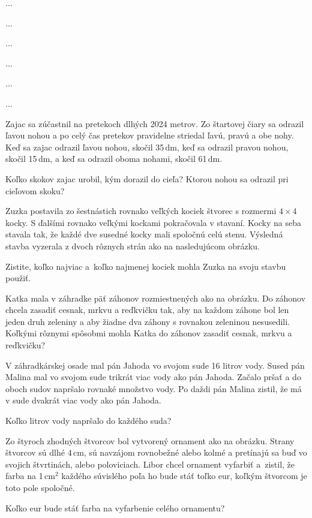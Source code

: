﻿{%
...}

{%
...}

{%
...}

{%
...}

{%
...}

{%
...}

{%
Zajac sa zúčastnil na pretekoch dlhých 2024 metrov.
Zo štartovej čiary sa odrazil ľavou nohou a po celý čas pretekov pravidelne striedal ľavú, pravú a obe nohy.
Keď sa zajac odrazil ľavou nohou, skočil 35\,dm, keď sa odrazil pravou nohou, skočil 15\,dm, a keď sa odrazil oboma nohami, skočil 61\,dm.

Koľko skokov zajac urobil, kým dorazil do cieľa?
Ktorou nohou sa odrazil pri cieľovom skoku?
}

{%
Zuzka postavila zo šestnástich rovnako veľkých kociek štvorec s rozmermi $4\times 4$ kocky.
S ďalšími rovnako veľkými kockami pokračovala v stavaní.
Kocky na seba stavala tak, že každé dve susedné kocky mali spoločnú celú stenu.
Výsledná stavba vyzerala z dvoch rôznych strán ako na nasledujúcom obrázku.

Zistite, koľko najviac a~koľko najmenej kociek mohla Zuzka na svoju stavbu použiť.
%
}

{%
Katka mala v záhradke päť záhonov rozmiestnených ako na obrázku.
Do záhonov chcela zasadiť cesnak, mrkvu a reďkvičku tak, aby na každom záhone bol len jeden druh zeleniny a aby žiadne dva záhony s rovnakou zeleninou nesusedili.
Koľkými rôznymi spôsobmi mohla Katka do záhonov zasadiť cesnak, mrkvu a reďkvičku?
%
}

{%
V záhradkárskej osade mal pán Jahoda vo svojom sude 16 litrov vody.
Sused pán Malina mal vo svojom sude trikrát viac vody ako pán Jahoda.
Začalo pršať a do oboch sudov napršalo rovnaké množstvo vody.
Po daždi pán Malina zistil, že má v sude dvakrát viac vody ako pán Jahoda.

Koľko litrov vody napršalo do každého suda?

}

{%
Zo štyroch zhodných štvorcov bol vytvorený ornament ako na obrázku.
Strany štvorcov sú dlhé 4\,cm, sú navzájom rovnobežné alebo kolmé a pretínajú sa buď vo svojich štvrtinách, alebo poloviciach.
Libor chcel ornament vyfarbiť a~zistil, že farba na 1\,cm$^2$ každého súvislého poľa ho bude stáť toľko eur, koľkým štvorcom je toto pole spoločné.

Koľko eur bude stáť farba na vyfarbenie celého ornamentu?
%
}


